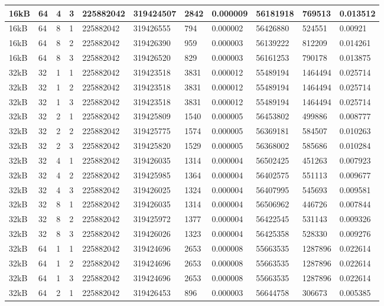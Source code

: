 \documentclass[conference]{IEEEtran}
\begin{document}
\begin{table}
\begin{tabular}{|m{.75cm} |m{.75cm} |m{.8cm} | m{.75cm} | l | l | l | l | l | l | l |}
16kB&	64&	4&	3&	225882042&	319424507&	2842  &0.000009&	56181918	&769513	  &0.013512 \\ \hline
16kB&	64&	8&	1&	225882042&	319426555&	794	  &0.000002&	56426880	&524551	  &0.00921  \\ \hline
16kB&	64&	8&	2&	225882042&	319426390&	959	  &0.000003&	56139222	&812209	  &0.014261 \\ \hline
16kB&	64&	8&	3&	225882042&	319426520&	829	  &0.000003&	56161253	&790178	  &0.013875 \\ \hline
32kB&	32&	1&	1&	225882042&	319423518&	3831  &0.000012&	55489194	&1464494	&0.025714 \\ \hline
32kB&	32&	1&	2&	225882042&	319423518&	3831  &0.000012&	55489194	&1464494	&0.025714 \\ \hline
32kB&	32&	1&	3&	225882042&	319423518&	3831  &0.000012&	55489194	&1464494	&0.025714 \\ \hline
32kB&	32&	2&	1&	225882042&	319425809&	1540  &0.000005&	56453802	&499886	  &0.008777 \\ \hline
32kB&	32&	2&	2&	225882042&	319425775&	1574  &0.000005&	56369181	&584507	  &0.010263 \\ \hline
32kB&	32&	2&	3&	225882042&	319425820&	1529  &0.000005&	56368002	&585686	  &0.010284 \\ \hline
32kB&	32&	4&	1&	225882042&	319426035&	1314  &0.000004&	56502425	&451263	  &0.007923 \\ \hline
32kB&	32&	4&	2&	225882042&	319425985&	1364  &	0.000004  &	56402575  &	551113	&0.009677 \\ \hline
32kB&	32&	4&	3&	225882042&	319426025&	1324  &	0.000004  &	56407995  &	545693	&0.009581 \\ \hline
32kB&	32&	8&	1&	225882042&	319426035&	1314  &	0.000004  &	56506962  &	446726	&0.007844 \\ \hline
32kB&	32&	8&	2&	225882042&	319425972&	1377  &	0.000004  &	56422545  &	531143	&0.009326 \\ \hline
32kB&	32&	8&	3&	225882042&	319426026&	1323  &	0.000004  &	56425358  &	528330	&0.009276 \\ \hline
32kB&	64&	1&	1&	225882042&	319424696&	2653  &	0.000008  &	55663535  &	1287896	&0.022614 \\ \hline
32kB&	64&	1&	2&	225882042&	319424696&	2653  &	0.000008  &	55663535  &	1287896	&0.022614 \\ \hline
32kB&	64&	1&	3&	225882042&	319424696&	2653  &	0.000008  &	55663535  &	1287896	&0.022614 \\ \hline
32kB&	64&	2&	1&	225882042&	319426453&	896	  &0.000003	  &56644758	  &306673	  &0.005385 \\ \hline

\end{tabular}
\end{table}
\end{document}
